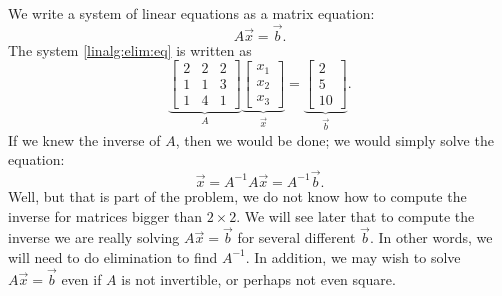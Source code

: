 We write a system of linear equations as a matrix equation:
\begin{equation*}
A \vec{x} = \vec{b} .
\end{equation*}
The system \eqref{linalg:elim:eq} is written as
\begin{equation*}
\underbrace{
\begin{bmatrix}
2 & 2 & 2 \\
1 & 1 & 3 \\
1 & 4 & 1 
\end{bmatrix}
}_{A}
\underbrace{
\begin{bmatrix}
x_1 \\
x_2 \\
x_3
\end{bmatrix} 
}_{\vec{x}}
=
\underbrace{
\begin{bmatrix}
2 \\
5 \\
10
\end{bmatrix}
}_{\vec{b}} .
\end{equation*}
If we knew the inverse of $A$, then we would be done; we would simply solve
the equation:
\begin{equation*}
\vec{x} = A^{-1} A \vec{x} = A^{-1} \vec{b} .
\end{equation*}
Well, but that is part of the problem, we do not know how to compute the
inverse for matrices bigger than $2 \times 2$.
We will see later that to compute the inverse we are really solving
$A \vec{x} = \vec{b}$ for several different $\vec{b}$.  In other words, 
we will need to do elimination to find $A^{-1}$.
In addition, we may wish to solve $A \vec{x} = \vec{b}$
even if $A$ is not invertible, or perhaps not even square.

\medskip

